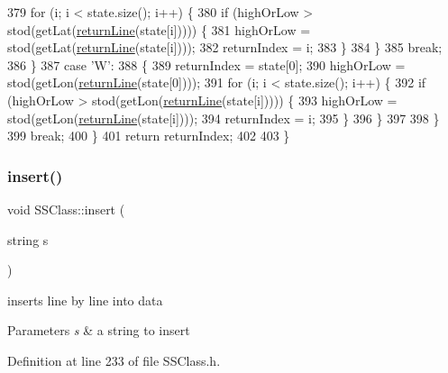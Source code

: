 \begin{DoxyCode}
379         \textcolor{keywordflow}{for} (i; i < state.size(); i++) \{
380             \textcolor{keywordflow}{if} (highOrLow > stod(getLat(\hyperlink{classSSClass_ab0a8ea1af895df28359b5733bd920ef3}{returnLine}(state[i])))) \{
381                 highOrLow = stod(getLat(\hyperlink{classSSClass_ab0a8ea1af895df28359b5733bd920ef3}{returnLine}(state[i])));
382                 returnIndex = i;
383             \}
384         \}
385         \textcolor{keywordflow}{break};
386     \}
387     \textcolor{keywordflow}{case} \textcolor{charliteral}{'W'}:
388     \{
389         returnIndex = state[0];
390         highOrLow = stod(getLon(\hyperlink{classSSClass_ab0a8ea1af895df28359b5733bd920ef3}{returnLine}(state[0])));
391         \textcolor{keywordflow}{for} (i; i < state.size(); i++) \{
392             \textcolor{keywordflow}{if} (highOrLow > stod(getLon(\hyperlink{classSSClass_ab0a8ea1af895df28359b5733bd920ef3}{returnLine}(state[i])))) \{
393                 highOrLow = stod(getLon(\hyperlink{classSSClass_ab0a8ea1af895df28359b5733bd920ef3}{returnLine}(state[i])));
394                 returnIndex = i;
395             \}
396         \}
397 
398     \}
399     \textcolor{keywordflow}{break};
400     \}
401     \textcolor{keywordflow}{return} returnIndex;
402 
403 \}
\end{DoxyCode}
\mbox{\label{classSSClass_a45c5585c784bf7c4f823f66426664aea}} 
\subsubsection{\texorpdfstring{insert()}{insert()}}
{\footnotesize\ttfamily void S\+S\+Class\+::insert (\begin{DoxyParamCaption}\item[{string}]{s }\end{DoxyParamCaption})}



inserts line by line into data 


\begin{DoxyParams}{Parameters}
{\em s} & a string to insert \\
\hline
\end{DoxyParams}


Definition at line 233 of file S\+S\+Class.\+h.


